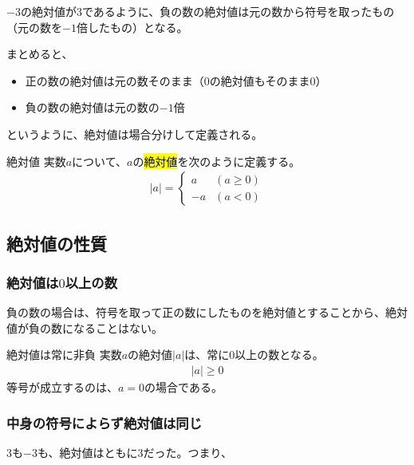\documentclass[../../math-imaging]{subfiles}
\begin{document}
$-3$の絶対値が$3$であるように、負の数の絶対値は元の数から符号を取ったもの（元の数を$-1$倍したもの）となる。

まとめると、

\begin{itemize}
  \item 正の数の絶対値は元の数そのまま（$0$の絶対値もそのまま$0$）
  \item 負の数の絶対値は元の数の$-1$倍
\end{itemize}

というように、絶対値は場合分けして定義される。

\begin{definition}{絶対値}
  \newline
  実数$a$について、$a$の\hl{絶対値}を次のように定義する。
  \LARGE
  \begin{align}
    |a| = \begin{cases}
            a  & (a \geq  0) \\
            -a & (a < 0)
          \end{cases}
  \end{align}
\end{definition}

\subsection{絶対値の性質}

\subsubsection{絶対値は$0$以上の数}

負の数の場合は、符号を取って正の数にしたものを絶対値とすることから、絶対値が負の数になることはない。

\begin{theorem}{絶対値は常に非負}
  \newline
  実数$a$の絶対値$|a|$は、常に$0$以上の数となる。
  \LARGE
  \begin{align}
    |a| \geq 0
  \end{align}
  \normalsize
  等号が成立するのは、$a=0$の場合である。
\end{theorem}

\subsubsection{中身の符号によらず絶対値は同じ}

$3$も$-3$も、絶対値はともに$3$だった。つまり、
\end{document}
